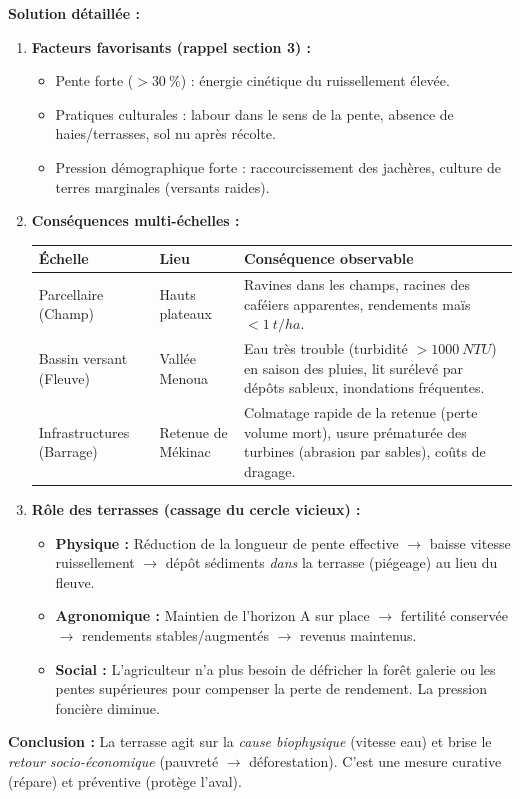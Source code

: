 \documentclass[11pt]{article}
\newcommand{\cle}[1]{{\popxbold\color{popdark}#1}}
\begin{document}
\begin{exoresolu}
\textbf{Solution détaillée :}
\begin{enumerate}
    \item \textbf{Facteurs favorisants (rappel section 3) :}
        \begin{itemize}
            \item \cle{Pente forte} ($> \SI{30}{\%}$) : énergie cinétique du ruissellement élevée.
            \item \cle{Pratiques culturales} : labour dans le sens de la pente, absence de haies/terrasses, sol nu après récolte.
            \item \cle{Pression démographique forte} : raccourcissement des jachères, culture de terres marginales (versants raides).
        \end{itemize}
    \item \textbf{Conséquences multi-échelles :}
        \begin{center}
        \begin{tabular}{|l|l|l|}\hline
        \textbf{Échelle} & \textbf{Lieu} & \textbf{Conséquence observable} \\ \hline
        Parcellaire (Champ) & Hauts plateaux & Ravines dans les champs, racines des caféiers apparentes, rendements maïs $< \SI{1}{t/ha}$. \\ \hline
        Bassin versant (Fleuve) & Vallée Menoua & Eau très trouble (turbidité $> \SI{1000}{NTU}$) en saison des pluies, lit surélevé par dépôts sableux, inondations fréquentes. \\ \hline
        Infrastructures (Barrage) & Retenue de Mékinac & Colmatage rapide de la retenue (perte volume mort), usure prématurée des turbines (abrasion par sables), coûts de dragage. \\ \hline
        \end{tabular}
        \end{center}
    \item \textbf{Rôle des terrasses (cassage du cercle vicieux) :}
        \begin{itemize}
            \item \textbf{Physique :} Réduction de la longueur de pente effective $\rightarrow$ baisse vitesse ruissellement $\rightarrow$ dépôt sédiments \emph{dans} la terrasse (piégeage) au lieu du fleuve.
            \item \textbf{Agronomique :} Maintien de l'horizon A sur place $\rightarrow$ fertilité conservée $\rightarrow$ rendements stables/augmentés $\rightarrow$ revenus maintenus.
            \item \textbf{Social :} L'agriculteur n'a plus besoin de défricher la forêt galerie ou les pentes supérieures pour compenser la perte de rendement. La pression foncière diminue.
        \end{itemize}
\end{enumerate}
\tcblower
\textbf{Conclusion :} La terrasse agit sur la \emph{cause biophysique} (vitesse eau) et brise le \emph{retour socio-économique} (pauvreté $\rightarrow$ déforestation). C'est une mesure \cle{curative} (répare) et \cle{préventive} (protège l'aval).
\end{exoresolu}
\end{document}
